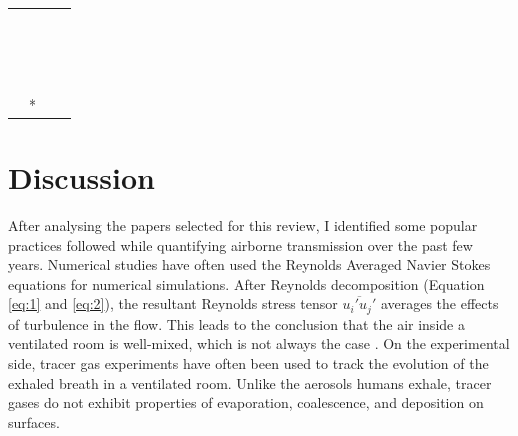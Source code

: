 \documentclass[a4paper,12pt]{elsarticle}
\begin{document}
\begin{longtable}{|m{3cm}|m{4.3cm}|m{4.4cm}|m{3.2cm}|}
     & \citet{liu2020full} &  &  \\
    
     & \citet{cheng2021experimental} &  &  \\
    
     & \citet{wang2022evaluation} &  &  \\
    
     & \citet{liu2023estimating} &  &  \\
    
     & \citet{wei2023effects} &  &  \\
    
     & \citet{li2021effects} &  &  \\
    
     & \citet{cortellessa2023effectiveness} &  &  \\
    
     & \citet{srivastava2021effective} &  &  \\

     & \citet{deng2021control} &  &  \\
   
     & \citet{xu2023cfd} &  &  \\
    
     & \citet{motamedi2022cfd} &  &  \\
    
     & \citet{arpino2023cfd} &  &  \\
    
     & \citet{pan2022boundary} &  &  \\
    
     & \citet{yang2021airborne} &  &  \\
     & \citet{sen2021transmission} &  &  \\
     & \citet{feng2020influence} &  &  \\
     & \citet{fontes2020study}* &  &  \\
    \hline
\end{longtable}

\section{Discussion}

After analysing the papers selected for this review, I identified some popular practices followed while quantifying airborne transmission over the past few years. Numerical studies have often used the Reynolds Averaged Navier Stokes equations for numerical simulations. After Reynolds decomposition (Equation \ref{eq:1} and \ref{eq:2}), the resultant Reynolds stress tensor $\overline{u_i'u_j'}$ averages the effects of turbulence in the flow. This leads to the conclusion that the air inside a ventilated room is well-mixed, which is not always the case \cite{salinas2022improved}. On the experimental side, tracer gas experiments have often been used to track the evolution of the exhaled breath in a ventilated room. Unlike the aerosols humans exhale, tracer gases do not exhibit properties of evaporation, coalescence, and deposition on surfaces. 
\end{document}
